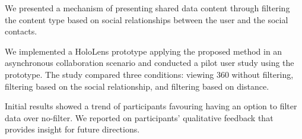 We presented a mechanism of presenting shared data content through filtering the content type based on social relationships between the user and the social contacts. 

We implemented a HoloLens prototype applying the proposed method in an asynchronous collaboration scenario and conducted a pilot user study using the prototype. The study compared three conditions: viewing 360 without filtering, filtering based on the social relationship, and filtering based on distance. 

Initial results showed a trend of participants favouring having an option to filter data over no-filter. We reported on participants' qualitative feedback that provides insight for future directions. 

